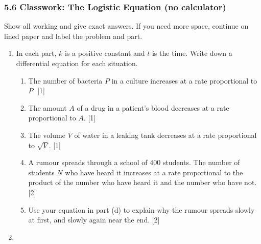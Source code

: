 \documentclass[12pt, twoside]{article}
\begin{document}
\subsubsection*{5.6 Classwork: The Logistic Equation (no calculator)}

Show all working and give exact answers. If you need more space, continue
on lined paper and label the problem and part.

\begin{enumerate}[itemsep=0.15cm]

\item[1.] [Maximum mark: 7]

In each part, $k$ is a positive constant and $t$ is the time. Write down a
differential equation for each situation.

\begin{enumerate}[itemsep=0.1cm]
  \item The number of bacteria $P$ in a culture increases at a rate
  proportional to $P$. \hfill [1]
  \item The amount $A$ of a drug in a patient's blood decreases at a rate
  proportional to $A$. \hfill [1]
  \item The volume $V$ of water in a leaking tank decreases at a rate
  proportional to $\sqrt{V}$. \hfill [1]
  \item A rumour spreads through a school of $400$ students. The number of
  students $N$ who have heard it increases at a rate proportional to the
  product of the number who have heard it and the number who have not.
  \hfill [2]
  \item Use your equation in part (d) to explain why the rumour spreads
  slowly at first, and slowly again near the end. \hfill [2]
\end{enumerate}


\newpage

\item[2.] [Maximum mark: 10]


\end{enumerate}
\end{document}
